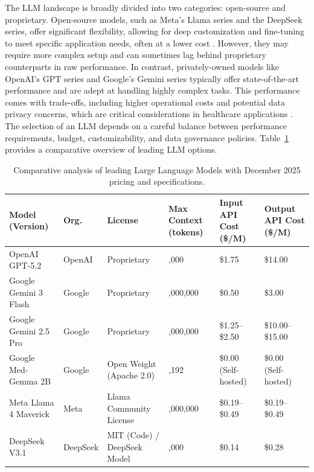 The LLM landscape is broadly divided into two categories: open-source and proprietary. Open-source models, such as Meta's Llama series and the DeepSeek series, offer significant flexibility, allowing for deep customization and fine-tuning to meet specific application needs, often at a lower cost \cite{civo2024}. However, they may require more complex setup and can sometimes lag behind proprietary counterparts in raw performance. In contrast, privately-owned models like OpenAI's GPT series and Google's Gemini series typically offer state-of-the-art performance and are adept at handling highly complex tasks. This performance comes with trade-offs, including higher operational costs and potential data privacy concerns, which are critical considerations in healthcare applications \cite{musick2025}. The selection of an LLM depends on a careful balance between performance requirements, budget, customizability, and data governance policies. Table~\ref{tab:llm_comparison} provides a comparative overview of leading LLM options.

\begin{table}[H]
\centering
\small
\begin{tabularx}{\textwidth}{| >{\raggedright\arraybackslash}X | l | >{\raggedright\arraybackslash}X | >{\centering\arraybackslash}X | >{\centering\arraybackslash}X | >{\centering\arraybackslash}X |}
\hline
\textbf{Model (Version)} & \textbf{Org.} & \textbf{License} & \textbf{Max Context (tokens)} & \textbf{Input API Cost (\$/M)} & \textbf{Output API Cost (\$/M)} \\
\hline
OpenAI GPT-5.2 \cite{openai2025pricing} & OpenAI & Proprietary & 128,000 & \$1.75 & \$14.00 \\
\hline
Google Gemini 3 Flash \cite{google2025pricing} & Google & Proprietary & 1,000,000 & \$0.50 & \$3.00 \\
\hline
Google Gemini 2.5 Pro \cite{google2025pricing} & Google & Proprietary & 1,000,000 & \$1.25--\$2.50 & \$10.00--\$15.00 \\
\hline
Google Med-Gemma 2B & Google & Open Weight (Apache 2.0) & 8,192 & \$0.00 (Self-hosted) & \$0.00 (Self-hosted) \\
\hline
Meta Llama 4 Maverick \cite{llama2025} & Meta & Llama Community License & 10,000,000 & \$0.19--\$0.49 & \$0.19--\$0.49 \\
\hline
DeepSeek V3.1 \cite{deepseek2025} & DeepSeek & MIT (Code) / DeepSeek Model & 128,000 & \$0.14 & \$0.28 \\
\hline
\end{tabularx}
\caption{Comparative analysis of leading Large Language Models with December 2025 pricing and specifications.}
\label{tab:llm_comparison}
\end{table}

